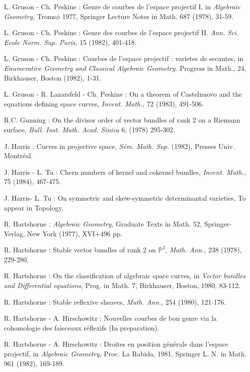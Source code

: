 \begin{thebibliography}{}
 L. Gruson - Ch. Peskine : Genre de courbes de l'espace projectif I, in {\em Algebraic Geometry,} Troms$\phi$ 1977, Springer Lecture Notes in Math. 687 (1978), 31-59.

 L. Gruson - Ch. Peskine : Genre des courbes de l'espace projectif II. {\em Ann. Sci. Ecole Norm. Sup. Paris,} 15 (1982), 401-418. 

  L. Gruson - Ch. Peskine : Courbes de l'espace projectif : varietes de secantes, in {\em Enumerative Geometry and Classical Algebraic Geometry.} Progress in Math., 24, Birkhauser, Boston (1982), 1-31.

 L. Gruson - R. Lazarsfeld - Ch. Peskine : On a theorem of Castelnuovo and the equations defining space curves, {\em Invent. Math.,} 72 (1983), 491-506.

 R.C. Gunning : On the divisor order of vector bundles of rank 2 on a Riemann surface, {\em Bull. Inst. Math. Acad. Sinica} 6, (1978) 295-302. 

 J. Harris : Curves in projective space, {\em S\'em. Math. Sup.} (1982), Presses Univ. Montr\'eal.

  J. Harris - L. Tu : Chern numbers of kernel and cokernel bundles, {\em Invent. Math.,} 75 (1984), 467-475.

 J. Harris\pageoriginale - L. Tu : On symmetric and skew-symmetric determinantal varieties, To appear in Topology.

 R. Hartshorne : {\em Algebraic Geometry,} Graduate Texts in Math. 52, Springer-Verlag, New York (1977), XVI+496 pp.

  R. Hartshorne : Stable vector bundles of rank 2 on $\mathbb{P}^{3}$, {\em Math. Ann.,} 238 (1978), 229-280.

 R. Hartshorne : On the classification of algebraic space curves, in {\em Vector bundles and Differential equations,} Prog. in Math. 7, Birkhauser, Boston, 1980, 83-112. 

 R. Hartshorne : Stable reflexive sheaves, {\em Math. Ann.,} 254 (1980), 121-176. 

 R. Hartshorne - A. Hirschowitz : Nouvelles courbes de bon genre via la cohomologie des faisceaux r\'eflexifs (In preparation). 

  R. Hartshorne - A. Hirschowitz : Droites en position g\'en\'erale dans l'espace projectif, in {\em Algebraic Geometry,} Proc. La Rabida, 1981, Springer L. N. in Math. 961 (1982), 169-189.


\end{thebibliography}
